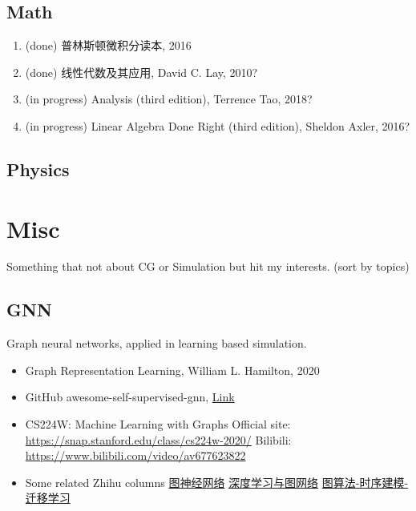 \documentclass{article}
\newcommand{\done}{
    (done)
}
\newcommand{\inprogress}{
    (in progress)
}
\begin{document}
\subsection{Math}
\begin{enumerate}
    \item \done 普林斯顿微积分读本, 2016
    \item \done 线性代数及其应用, David C. Lay, 2010?
    \item \inprogress Analysis (third edition), Terrence Tao, 2018?
    \item \inprogress Linear Algebra Done Right (third edition), Sheldon Axler, 2016?
\end{enumerate}
\subsection{Physics}

\section{Misc}
\par Something that not about CG or Simulation but hit my interests. (sort by topics)
\subsection{GNN}
\par Graph neural networks, applied in learning based simulation.
\begin{itemize}
    \item Graph Representation Learning, William L. Hamilton, 2020
    \item GitHub awesome-self-supervised-gnn, \href{https://github.com/ChandlerBang/awesome-self-supervised-gnn}{Link}
    \item CS224W: Machine Learning with Graphs \newline Official site: \href{https://snap.stanford.edu/class/cs224w-2020/}{https://snap.stanford.edu/class/cs224w-2020/} \newline Bilibili: \href{https://www.bilibili.com/video/av677623822}{https://www.bilibili.com/video/av677623822}
    \item Some related Zhihu columns \newline \href{https://www.zhihu.com/column/c_1330471030893662208}{图神经网络} \newline \href{https://www.zhihu.com/column/marlin}{深度学习与图网络} \newline \href{https://www.zhihu.com/column/c_1115285924917047296}{图算法-时序建模-迁移学习}
\end{itemize}
\end{document}
